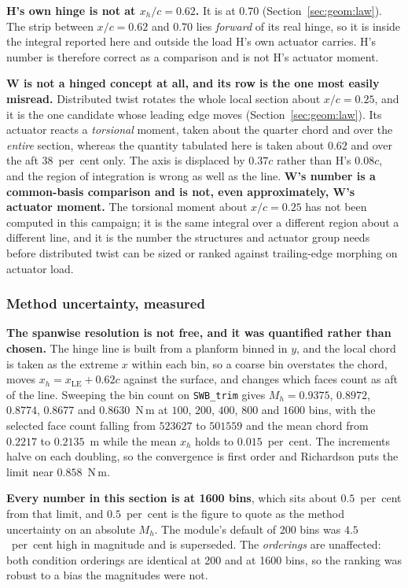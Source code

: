 \textbf{H's own hinge is not at $x_h/c = 0.62$.} It is at $0.70$ (Section~\ref{sec:geom:law}). The
strip between $x/c = 0.62$ and $0.70$ lies \emph{forward} of its real hinge, so it is inside the
integral reported here and outside the load H's own actuator carries. H's number is therefore
correct as a comparison and is not H's actuator moment.

\textbf{W is not a hinged concept at all, and its row is the one most easily misread.} Distributed
twist rotates the whole local section about $x/c = 0.25$, and it is the one candidate whose leading
edge moves (Section~\ref{sec:geom:law}). Its actuator reacts a \emph{torsional} moment, taken about
the quarter chord and over the \emph{entire} section, whereas the quantity tabulated here is taken
about $0.62$ and over the aft $38$~per~cent only. The axis is displaced by $0.37c$ rather than H's
$0.08c$, and the region of integration is wrong as well as the line. \textbf{W's number is a
common-basis comparison and is not, even approximately, W's actuator moment.} The torsional moment
about $x/c = 0.25$ has not been computed in this campaign; it is the same integral over a different
region about a different line, and it is the number the structures and actuator group needs before
distributed twist can be sized or ranked against trailing-edge morphing on actuator load.

\subsubsection{Method uncertainty, measured}
\label{sec:hinge:uncertainty}

\textbf{The spanwise resolution is not free, and it was quantified rather than chosen.} The hinge
line is built from a planform binned in $y$, and the local chord is taken as the extreme $x$ within
each bin, so a coarse bin overstates the chord, moves $x_h = x_\mathrm{LE} + 0.62c$ against the
surface, and changes which faces count as aft of the line. Sweeping the bin count on
\texttt{SWB\_trim} gives $M_h = 0.9375$, $0.8972$, $0.8774$, $0.8677$ and $0.8630$~N\,m at
$100$, $200$, $400$, $800$ and $1600$ bins, with the selected face count falling from
$\num{523627}$ to $\num{501559}$ and the mean chord from $0.2217$ to $0.2135$~m while the mean
$x_h$ holds to $0.015$~per~cent. The increments halve on each doubling, so the convergence is
first order and Richardson puts the limit near $0.858$~N\,m.

\textbf{Every number in this section is at 1600 bins}, which sits about $0.5$~per~cent from that
limit, and $0.5$~per~cent is the figure to quote as the method uncertainty on an absolute $M_h$.
The module's default of 200 bins was $4.5$~per~cent high in magnitude and is superseded. The
\emph{orderings} are unaffected: both condition orderings are identical at 200 and at 1600 bins,
so the ranking was robust to a bias the magnitudes were not.

